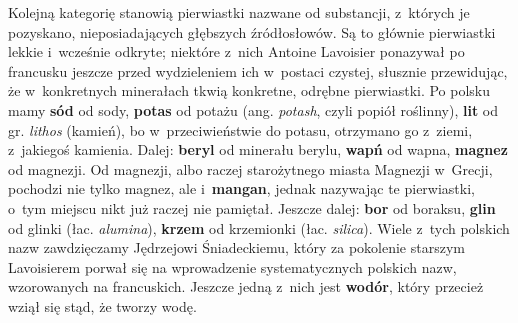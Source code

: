 Kolejną kategorię stanowią pierwiastki nazwane od substancji, z~których
je pozyskano, nieposiadających głębszych źródłosłowów. Są to głównie
pierwiastki lekkie i~wcześnie odkryte; niektóre z~nich Antoine Lavoisier
ponazywał po francusku jeszcze przed wydzieleniem ich w~postaci czystej,
słusznie przewidując, że w~konkretnych minerałach tkwią konkretne,
odrębne pierwiastki. Po polsku mamy \textbf{sód} od sody, \textbf{potas}
od potażu (ang. \emph{potash}, czyli popiół roślinny), \textbf{lit} od
gr. \emph{lithos} (kamień), bo w~przeciwieństwie do potasu, otrzymano go
z~ziemi, z~jakiegoś kamienia. Dalej: \textbf{beryl} od minerału berylu,
\textbf{wapń} od wapna, \textbf{magnez} od magnezji. Od magnezji, albo
raczej starożytnego miasta Magnezji w~Grecji, pochodzi nie tylko magnez,
ale i~\textbf{mangan}, jednak nazywając te pierwiastki, o~tym miejscu
nikt już raczej nie pamiętał. Jeszcze dalej: \textbf{bor} od boraksu,
\textbf{glin} od glinki (łac. \emph{alumina}), \textbf{krzem} od
krzemionki (łac. \emph{silica}). Wiele z~tych polskich nazw zawdzięczamy
Jędrzejowi Śniadeckiemu, który za pokolenie starszym Lavoisierem porwał
się na wprowadzenie systematycznych polskich nazw, wzorowanych na
francuskich. Jeszcze jedną z~nich jest \textbf{wodór}, który przecież
wziął się stąd, że tworzy wodę.\eject
